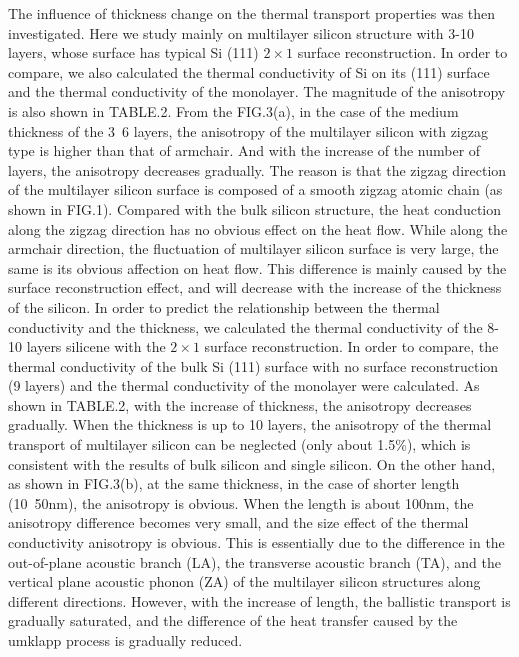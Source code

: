 \documentclass[%
 reprint,
 amsmath,amssymb,
 aps,
prb,
]{revtex4-1}
\begin{document}
The influence of thickness change on the thermal transport properties was then investigated. Here we study mainly on multilayer silicon structure with 3-10 layers, whose  surface has typical Si (111) $2 \times 1$ surface reconstruction. In order to compare, we also calculated the thermal conductivity of Si on its (111) surface and the thermal conductivity of the monolayer. The magnitude of the anisotropy is also shown in TABLE.2. From the FIG.3(a), in the case of the medium thickness of the 3~6 layers, the anisotropy of the multilayer silicon with zigzag type is higher than that of armchair. And with the increase of the number of layers, the anisotropy decreases gradually. The reason is that the zigzag direction of the multilayer silicon surface is composed of a smooth zigzag atomic chain (as shown in FIG.1). Compared with the bulk silicon structure, the heat conduction along the zigzag direction has no obvious effect on the heat flow. While along the armchair direction, the fluctuation of multilayer silicon surface is very large, the same is its obvious affection on heat flow. This difference is mainly caused by the surface reconstruction effect, and will decrease with the increase of the thickness of the silicon. In order to predict the relationship between the thermal conductivity and the thickness, we calculated the thermal conductivity of the 8-10 layers silicene with the $2 \times 1$ surface reconstruction. In order to compare, the thermal conductivity of the bulk Si (111) surface with no surface reconstruction (9 layers) and the thermal conductivity of the monolayer were calculated. As shown in TABLE.2, with the increase of thickness, the anisotropy decreases gradually. When the thickness is up to 10 layers, the anisotropy of the thermal transport of multilayer silicon can be neglected (only about 1.5\%), which is consistent with the results of bulk silicon and single silicon. On the other hand, as shown in FIG.3(b), at the same thickness, in the case of shorter length (10~50nm), the anisotropy is obvious. When the length is about 100nm, the anisotropy difference becomes very small, and the size effect of the thermal conductivity anisotropy is obvious. This is essentially due to the difference in the out-of-plane acoustic branch (LA), the transverse acoustic branch (TA), and the vertical plane acoustic phonon (ZA) of the multilayer silicon structures along different directions. However, with the increase of length, the ballistic transport is gradually saturated, and the difference of the heat transfer caused by the umklapp process is gradually reduced.
\end{document}
